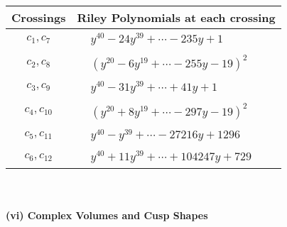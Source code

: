 \documentclass[1p]{elsarticle_modified}
\theoremstyle{definition}
\begin{document}
\begin{tabular}{m{50pt}|m{274pt}}
Crossings & \hspace{64pt}Riley Polynomials at each crossing \\
\hline $$\begin{aligned}c_{1},c_{7}\end{aligned}$$&$\begin{aligned}
&y^{40}-24 y^{39}+\cdots-235 y+1
\end{aligned}$\\
\hline $$\begin{aligned}c_{2},c_{8}\end{aligned}$$&$\begin{aligned}
&(y^{20}-6 y^{19}+\cdots-255 y-19)^{2}
\end{aligned}$\\
\hline $$\begin{aligned}c_{3},c_{9}\end{aligned}$$&$\begin{aligned}
&y^{40}-31 y^{39}+\cdots+41 y+1
\end{aligned}$\\
\hline $$\begin{aligned}c_{4},c_{10}\end{aligned}$$&$\begin{aligned}
&(y^{20}+8 y^{19}+\cdots-297 y-19)^{2}
\end{aligned}$\\
\hline $$\begin{aligned}c_{5},c_{11}\end{aligned}$$&$\begin{aligned}
&y^{40}- y^{39}+\cdots-27216 y+1296
\end{aligned}$\\
\hline $$\begin{aligned}c_{6},c_{12}\end{aligned}$$&$\begin{aligned}
&y^{40}+11 y^{39}+\cdots+104247 y+729
\end{aligned}$\\
\hline
\end{tabular}\\~\\
\newpage\flushleft \textbf{(vi) Complex Volumes and Cusp Shapes}
\end{document}
